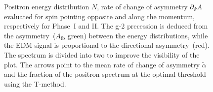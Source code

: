 \begin{refsection}
\begin{figure}
	\hfill
	\caption{Positron energy distribution $N$, rate of change of asymmetry $\partial_\Psi A$ evaluated for spin pointing opposite and along the momentum, respectively for Phase~I and II\@. The g-2 precession is deduced from the asymmetry~($A_\mathrm{fb}$ green) between the energy distributions, while the EDM signal is proportional to the directional asymmetry~(red). The spectrum is divided into two to improve the visibility of the plot. The arrows point to the mean rate of change of asymmetry $\tilde \alpha$ and the fraction of the positron spectrum at the optimal threshold using the T-method. }
	\label{fig:n_dot_a}
\end{figure}



\end{refsection}
